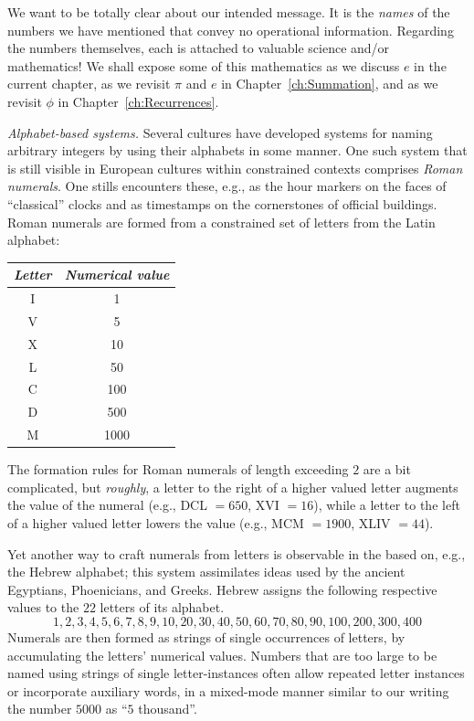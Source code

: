 We want to be totally clear about our intended message.  It is the
{\em names} of the numbers we have mentioned that convey no
operational information.  Regarding the numbers themselves, each is
attached to valuable science and/or mathematics!  We shall expose some
of this mathematics as we discuss $e$ in the current chapter, as we
revisit $\pi$ and $e$ in Chapter~\ref{ch:Summation}, and as we revisit
$\phi$ in Chapter~\ref{ch:Recurrences}.

\medskip

\noindent
{\it Alphabet-based systems.}
%
Several cultures have developed systems for naming arbitrary integers
by using their alphabets in some manner.  One such system that is
still visible in European cultures within constrained contexts
comprises {\it Roman numerals}.  One stills
encounters these, e.g., as the hour markers on the faces of
``classical'' clocks and as timestamps on the cornerstones of official
buildings.  Roman numerals are formed from a constrained set of
letters from the Latin alphabet:

\begin{tabular}{c|c}
{\it Letter} & {\it Numerical value} \\
\hline
I  & 1 \\
V  & 5 \\
X  & 10 \\
L  & 50 \\
C  & 100 \\
D  & 500 \\
M  & 1000
\end{tabular}

\noindent
The formation rules for Roman numerals of length exceeding $2$ are a
bit complicated, but {\em roughly}, a letter to the right of a higher
valued letter augments the value of the numeral (e.g., DCL $=650$, XVI
$=16$), while a letter to the left of a higher valued letter lowers
the value (e.g., MCM $=1900$, XLIV $=44$).

Yet another way to craft numerals from letters is observable in the
based on, e.g., the Hebrew alphabet;  this
system assimilates ideas used by the ancient Egyptians, Phoenicians,
and Greeks.  Hebrew assigns the following respective values to the
$22$ letters of its alphabet.
\[ 1, 2, 3, 4, 5, 6, 7, 8, 9, 10,
20, 30, 40, 50, 60, 70, 80, 90, 100,
 200, 300, 400
\]
Numerals are then formed as strings of single occurrences of letters,
by accumulating the letters' numerical values.  Numbers that are too
large to be named using strings of single letter-instances often allow
repeated letter instances or incorporate auxiliary words, in a
mixed-mode manner similar to our writing the number $5000$ as ``$5$
thousand''.  

